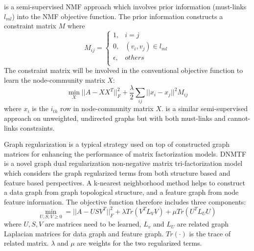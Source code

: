 \cite{liu2017semi} is a semi-supervised NMF approach which involves prior information (must-links $l_{ml}$) into the NMF objective function. The prior information constructs a constraint matrix $M$ where 
\begin{equation}
M_{ij} = 
\begin{cases}
1,&   i = j\\ 
0,  & (v_i,v_j )\in l_{ml} \\ 
\epsilon,  & others\\ 
\end{cases}
\end{equation}
The constraint matrix will be involved in the conventional objective function to learn the node-community matrix $X$:
\begin{equation}
\min_{X} ||A-XX^T||^2_F + \frac{\lambda}{2}\sum_{ij}||x_i - x_j||^2M_{ij}
\end{equation}
where $x_i$ is the $i_{th}$ row in node-community matrix $X$.  \cite{shi2015community} is a similar semi-supervised approach on unweighted, undirected graphs but with both must-links and cannot-links constraints. 

Graph regularization is a typical strategy used on top of constructed graph matrices for enhancing the performance of matrix factorization models.  DNMTF \cite{shang2012graph} is a novel graph dual regularization non-negative matrix tri-factorization model which considers the graph regularized terms from both structure based and feature based perspectives. A k-nearest neighborhood method helps to construct a data graph from graph topological structure,  and a feature graph from node feature information. The objective function therefore includes three components:
\begin{equation}
	\min_{U,S,V \geq 0} = ||A- USV^T||^2_F + \lambda Tr(V^TL_V V) + \mu Tr(U^T L_UU)
\end{equation}
where $U,S,V$ are matrices need to be learned, $L_v$ and $L_U$ are related graph Laplacian matrices for data graph and feature graph. $Tr(\cdot)$ is the trace of related matrix. $\lambda$ and $\mu$ are weights for the two regularized terms.

